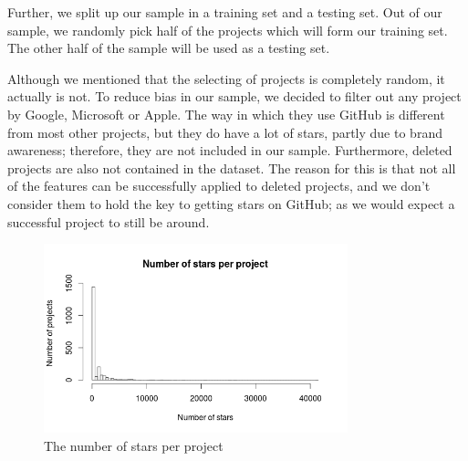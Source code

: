         Further, we split up our sample in a training set and a testing set. Out of our sample, we randomly pick half of the projects which will form our training set. The other half of the sample will be used as a testing set.
        
        Although we mentioned that the selecting of projects is completely random, it actually is not. To reduce bias in our sample, we decided to filter out any project by Google, Microsoft or Apple.
        The way in which they use GitHub is different from most other projects, but they do have a lot of stars, partly due to brand awareness; therefore, they are not included in our sample.
        Furthermore, deleted projects are also not contained in the dataset.
        The reason for this is that not all of the features can be successfully applied to deleted projects, and we don't consider them to hold the key to getting stars on GitHub; as we would expect a successful project to still be around.
        
        
    \begin{figure}[t!]
        \includegraphics[width=250pt]{figures/number-of-stars-per-project}
	    \caption{The number of stars per project}
	    \label{fig:nr-stars-plot}
	\end{figure}
    
